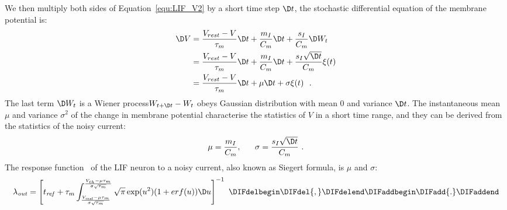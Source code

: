 	We then multiply \DIFdelbegin {}\DIFdelend both sides of Equation~\ref{equ:LIF_V2} by a short time step $\D t$, the stochastic differential equation of the membrane potential is: %
	\begin{equation}
	\begin{aligned}
	\D V&= \frac{V_{rest} - V}{\tau_m }\D t + \frac{m_I}{C_m} \D t + \frac{s_I}{C_m}  \D W_t \\
	&=\frac{V_{rest} - V}{\tau_m }\D t + \frac{m_I}{C_m} \D t + \frac{s_I \sqrt{\D t}}{C_m} \xi(t)  \\
	&=\frac{V_{rest} - V}{\tau_m }\D t + \mu \D t + \sigma \xi(t) ~~. 
	\end{aligned}
	\end{equation}	
	The last term $\D W_t$ is a Wiener process\DIFdelbegin {}\DIFdelend \DIFaddbegin \DIFadd{; }\DIFaddend $W_{t +\D t} - W_{t}$ obeys \DIFaddbegin {}\DIFaddend Gaussian distribution with mean 0 and variance $\D t$.
	The instantaneous mean $\mu$ and variance $\sigma^2$ of the change in membrane potential characterise the statistics of $V$ in a short time range, and they can be derived from the statistics of the noisy current:
	\begin{equation}
	\mu =\dfrac{m_I}{C_m}, ~~~~~ \sigma = \dfrac{s_I \sqrt{\D t}}{C_m}~.
	\end{equation}
	The response function~\citep{rauch2003neocortical,la2008response} of the LIF neuron to a noisy current, also known as \DIFaddbegin {}\DIFaddend Siegert formula, is \DIFdelbegin {}\DIFdelend \DIFaddbegin {}\DIFaddend $\mu$ and $\sigma$:
	\begin{equation}
	\lambda_\mathit{out}=
	\left [ t_\mathit{ref}+\tau_m \int_{\frac{V_\mathit{rest}-\mu \tau_m }{\sigma \sqrt{\tau_m}}}^{\frac{V_{th}-\mu \tau_m }{\sigma \sqrt{\tau_m}}} \sqrt{\pi} \exp(u^{2}) (1+erf(u)) \D u \right ]^{-1} ~\DIFdelbegin \DIFdel{,
	}\DIFdelend \DIFaddbegin \DIFadd{.
	}\DIFaddend \label{equ:siegert}
	\end{equation}


